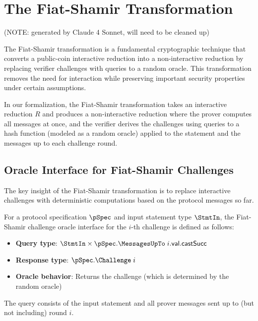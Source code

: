 \section{The Fiat-Shamir Transformation}\label{sec:fiat_shamir}

(NOTE: generated by Claude 4 Sonnet, will need to be cleaned up)

The Fiat-Shamir transformation is a fundamental cryptographic technique that converts a public-coin interactive reduction into a non-interactive reduction by replacing verifier challenges with queries to a random oracle. This transformation removes the need for interaction while preserving important security properties under certain assumptions.

In our formalization, the Fiat-Shamir transformation takes an interactive reduction $R$ and produces a non-interactive reduction where the prover computes all messages at once, and the verifier derives the challenges using queries to a hash function (modeled as a random oracle) applied to the statement and the messages up to each challenge round.

\subsection{Oracle Interface for Fiat-Shamir Challenges}\label{sec:fiat_shamir_oracle_interface}

The key insight of the Fiat-Shamir transformation is to replace interactive challenges with deterministic computations based on the protocol messages so far.

\begin{definition}
    \label{def:fiat_shamir_challenge_oracle_interface}
    For a protocol specification $\pSpec$ and input statement type $\StmtIn$, the Fiat-Shamir challenge oracle interface for the $i$-th challenge is defined as follows:
    \begin{itemize}
        \item \textbf{Query type}: $\StmtIn \times \pSpec.\MessagesUpTo \;i.\mathsf{val}.\mathsf{castSucc}$
        \item \textbf{Response type}: $\pSpec.\Challenge \;i$
        \item \textbf{Oracle behavior}: Returns the challenge (which is determined by the random oracle)
    \end{itemize}

    The query consists of the input statement and all prover messages sent up to (but not including) round $i$.
\end{definition}

